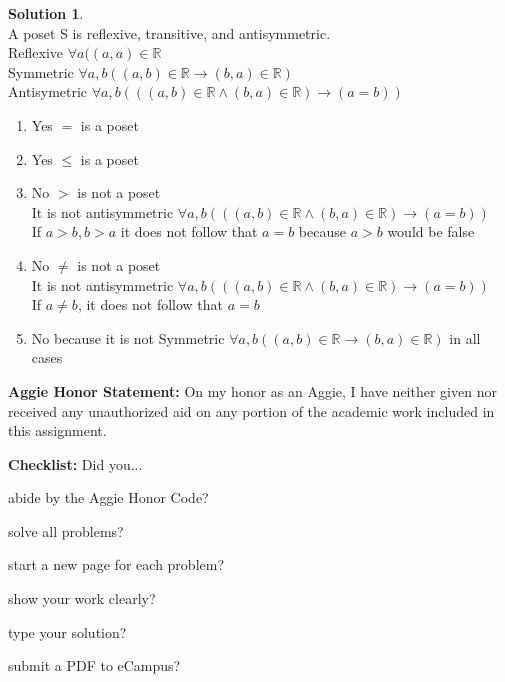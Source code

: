 \documentclass{article}
\theoremstyle{definition}
\newtheorem*{solution}{Solution}
\newcommand{\honor}{\noindent \textbf{Aggie Honor Statement: }On my honor as an Aggie, I have neither
  given nor received any unauthorized aid on any portion of the academic work included in this assignment.
}
\newcommand{\checklist}{\noindent\textbf{Checklist:}
Did you...
\begin{compactenum}
\item abide by the Aggie Honor Code?
\item solve all problems?
\item start a new page for each problem?
\item show your work clearly?
\item type your solution?
\item submit a PDF to eCampus?
\end{compactenum}
}
\begin{document}
\begin{solution}\ \\
A poset S is reflexive, transitive, and antisymmetric.\\
 Reflexive $\forall a((a,a) \in \mathbb{R}$ \\
 Symmetric $\forall a,b((a,b) \in \mathbb{R} \rightarrow (b,a) \in \mathbb{R})$ \\
 Antisymetric $\forall a,b (((a,b) \in \mathbb{R} \wedge (b,a) \in \mathbb{R}) \rightarrow (a=b))$
\begin{enumerate}
  \item Yes $=$ is a poset
  \item Yes $\leq$ is a poset
  \item No $>$ is not a poset \\
    It is not antisymmetric $\forall a,b (((a,b) \in \mathbb{R} \wedge (b,a) \in \mathbb{R}) \rightarrow (a=b))$ \\
    If $a > b, b > a$ it does not follow that $a = b$ because $a > b$ would be false
    \item No $\neq$ is not a poset\\
        It is not antisymmetric $\forall a,b (((a,b) \in \mathbb{R} \wedge (b,a) \in \mathbb{R}) \rightarrow (a=b))$ \\
        If $a\neq b$, it does not follow that $a=b$
      \item No because it is not  Symmetric $\forall a,b((a,b) \in \mathbb{R} \rightarrow (b,a) \in \mathbb{R})$ in all cases
\end{enumerate}

\end{solution}

\bigskip
\honor

\bigskip
\checklist
\end{document}
